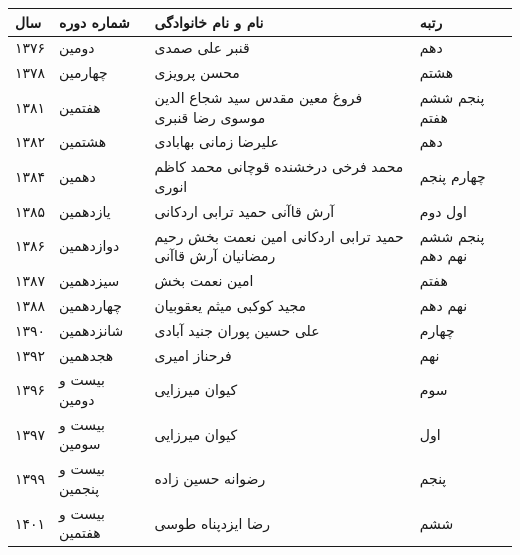 \documentclass[
  letterpaper,
  DIV=11,
  numbers=noendperiod]{scrreprt}
\newcounter{none} %
\begin{document}
{\def\LTcaptype{none} %
\begin{longtable}[]{@{}
  >{\raggedright\arraybackslash}p{}
  >{\raggedright\arraybackslash}p{}
  >{\raggedright\arraybackslash}p{}
  >{\raggedright\arraybackslash}p{}@{}}
\toprule\noalign{}
\begin{minipage}[b]{\linewidth}\raggedright
سال
\end{minipage} & \begin{minipage}[b]{\linewidth}\raggedright
شماره دوره
\end{minipage} & \begin{minipage}[b]{\linewidth}\raggedright
نام و نام خانوادگی
\end{minipage} & \begin{minipage}[b]{\linewidth}\raggedright
رتبه
\end{minipage} \\
\midrule\noalign{}
\endhead
\bottomrule\noalign{}
\endlastfoot
۱۳۷۶ & دومین & قنبر علی صمدی & دهم \\
۱۳۷۸ & چهارمین & محسن پرویزی & هشتم \\
۱۳۸۱ & هفتمین & فروغ معین مقدس سید شجاع الدین موسوی رضا قنبری & پنجم ششم
هفتم \\
۱۳۸۲ & هشتمین & علیرضا زمانی بهابادی & دهم \\
۱۳۸۴ & دهمین & محمد فرخی درخشنده قوچانی محمد کاظم انوری & چهارم پنجم \\
۱۳۸۵ & یازدهمین & آرش قاآنی حمید ترابی اردکانی & اول دوم \\
۱۳۸۶ & دوازدهمین & حمید ترابی اردکانی امین نعمت بخش رحیم رمضانیان آرش
قاآنی & پنجم ششم نهم دهم \\
۱۳۸۷ & سیزدهمین & امین نعمت بخش & هفتم \\
۱۳۸۸ & چهاردهمین & مجید کوکبی میثم یعقوبیان & نهم دهم \\
۱۳۹۰ & شانزدهمین & علی حسین پوران جنید آبادی & چهارم \\
۱۳۹۲ & هجدهمین & فرحناز امیری & نهم \\
۱۳۹۶ & بیست و دومین & کیوان میرزایی & سوم \\
۱۳۹۷ & بیست و سومین & کیوان میرزایی & اول \\
۱۳۹۹ & بیست و پنجمین & رضوانه حسین زاده & پنجم \\
۱۴۰۱ & بیست و هفتمین & رضا ایزدپناه طوسی & ششم \\
\end{longtable}
}
\end{document}
